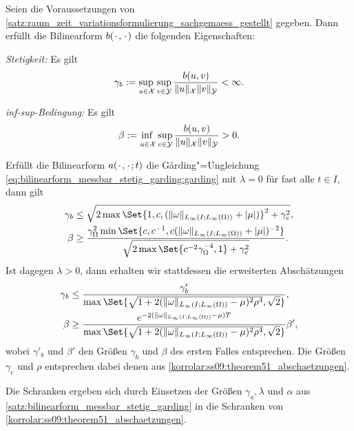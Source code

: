 \documentclass[../main.tex]{subfiles}
\begin{document}
\begin{Korollar}
\label{korollar:rz_variationsformulierung_stetig_infsup_schranken}
    Seien die Voraussetzungen von \cref{satz:raum_zeit_variationsformulierung_sachgemaess_gestellt} gegeben.
    Dann erfüllt die Bilinearform $b({\mkern2mu\cdot\mkern2mu}, {\mkern2mu\cdot\mkern2mu})$ die folgenden Eigenschaften:
    \begin{thmenumerate}
        \item \emph{Stetigkeit:} Es gilt
            \begin{equation}
                \gamma_{b} := \supsup{u \in \mathcal X}{v \in \mathcal Y} \frac{b(u, v)}{\norm{u}_{\mathcal X} \norm{v}_{\mathcal Y}} < \infty.
            \end{equation}
        \item \emph{inf-sup-Bedingung:} Es gilt
            \begin{equation}
                \beta := \infsup{u \in \mathcal X}{v \in \mathcal Y} \frac{b(u, v)}{\norm{u}_{\mathcal X} \norm{v}_{\mathcal Y}} > 0.
            \end{equation}
    \end{thmenumerate}
    Erfüllt die Bilinearform $a({\mkern2mu\cdot\mkern2mu}, {\mkern2mu\cdot\mkern2mu}; t)$ die G\aa{}rding"=Ungleichung \cref{eq:bilinearform_messbar_stetig_garding:garding} mit $\lambda = 0$ für fast alle $t \in I$, dann gilt
    \begin{align}
        \gamma_{b}  &\leq \sqrt{2 \max\Set{ 1, c, (\norm{\omega}_{L_{\infty}(I; L_{\infty}(\Omega))} + \abs{\mu}) }^{2} + \gamma_{e}^{2} }, \\
        \beta &\geq \frac{\gamma_{\Omega}^{2} \min\Set{c, c^{-1}, c(\norm{\omega}_{L_{\infty}(I; L_{\infty}(\Omega))} + \abs{\mu})^{-2}}}{\sqrt{2 \max\Set{c^{-2}\gamma_{\Omega}^{-4}, 1} + \gamma_{e}^{2}}}.
    \end{align}
    Ist dagegen $\lambda > 0$, dann erhalten wir stattdessen die erweiterten Abschätzungen
    \begin{align}
        \gamma_{b} &\leq \frac{\gamma'_{b}}{\max\Set{\sqrt{1 + 2 (\norm{\omega}_{L_{\infty}(I; L_{\infty}(\Omega))} - \mu)^{2} \rho^{4} }, \sqrt{2}}}, \\
        \beta &\geq \frac{e^{-2(\norm{\omega}_{L_{\infty}(I; L_{\infty}(\Omega))} - \mu) T}}{\max\Set{\sqrt{1 + 2 (\norm{\omega}_{L_{\infty}(I; L_{\infty}(\Omega))} - \mu)^{2} \rho^{4} }, \sqrt{2}}} \beta',
    \end{align}
    wobei $\gamma'_{b}$ und $\beta'$ den Größen $\gamma_{b}$ und $\beta$ des ersten Falles entsprechen.
    Die Größen $\gamma_{e}$ und $\rho$ entsprechen dabei denen aus \cref{korrolar:ss09:theorem51_abschaetzungen}.

    \begin{Beweis}
        Die Schranken ergeben sich durch Einsetzen der Größen $\gamma_{a}, \lambda$ und $\alpha$ aus \cref{satz:bilinearform_messbar_stetig_garding} in die Schranken von \cref{korrolar:ss09:theorem51_abschaetzungen}.
    \end{Beweis}
\end{Korollar}
\end{document}
